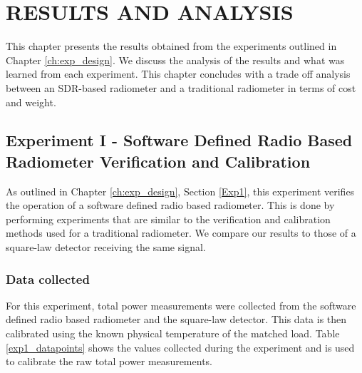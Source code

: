 


\chapter{RESULTS AND ANALYSIS}\label{ch:results}
This chapter presents the results obtained from the experiments outlined in Chapter \ref{ch:exp_design}.  We discuss the analysis of the results and what was learned from each experiment.  This chapter concludes with a trade off analysis between an SDR-based radiometer and a traditional radiometer in terms of cost and weight.

\section{Experiment I - Software Defined Radio Based Radiometer Verification and Calibration} \label{Exp1_results}
As outlined in Chapter \ref{ch:exp_design}, Section \ref{Exp1}, this experiment verifies the operation of a software defined radio based radiometer.  This is done by performing experiments that are similar to the verification and calibration methods used for a traditional radiometer.  We compare our results to those of a square-law detector receiving the same signal.

\subsection{Data collected}\label{Exp1_data}

For this experiment, total power measurements were collected from the software defined radio based radiometer and the square-law detector.  This data is then calibrated using the known physical temperature of the matched load.  Table \ref{exp1_datapoints} shows the values collected during the experiment and is used to calibrate the raw total power measurements.

